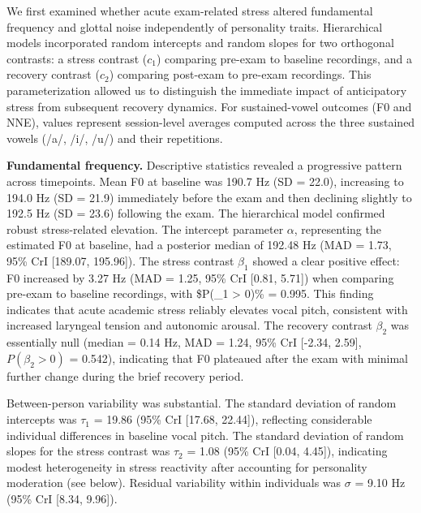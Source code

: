 \documentclass[
  english,
  man]{apa6}
\begin{document}
We first examined whether acute exam-related stress altered fundamental frequency and glottal noise independently of personality traits. Hierarchical models incorporated random intercepts and random slopes for two orthogonal contrasts: a stress contrast (\(c_1\)) comparing pre-exam to baseline recordings, and a recovery contrast (\(c_2\)) comparing post-exam to pre-exam recordings. This parameterization allowed us to distinguish the immediate impact of anticipatory stress from subsequent recovery dynamics. For sustained-vowel outcomes (F0 and NNE), values represent session-level averages computed across the three sustained vowels (/a/, /i/, /u/) and their repetitions.

\textbf{Fundamental frequency.} Descriptive statistics revealed a progressive pattern across timepoints. Mean F0 at baseline was 190.7 Hz (SD = 22.0), increasing to 194.0 Hz (SD = 21.9) immediately before the exam and then declining slightly to 192.5 Hz (SD = 23.6) following the exam. The hierarchical model confirmed robust stress-related elevation. The intercept parameter \(\alpha\), representing the estimated F0 at baseline, had a posterior median of 192.48 Hz (MAD = 1.73, 95\% CrI {[}189.07, 195.96{]}). The stress contrast \(\beta_1\) showed a clear positive effect: F0 increased by 3.27 Hz (MAD = 1.25, 95\% CrI {[}0.81, 5.71{]}) when comparing pre-exam to baseline recordings, with \$P(\beta\_1 \textgreater{} 0)\% = 0.995. This finding indicates that acute academic stress reliably elevates vocal pitch, consistent with increased laryngeal tension and autonomic arousal. The recovery contrast \(\beta_2\) was essentially null (median = 0.14 Hz, MAD = 1.24, 95\% CrI {[}-2.34, 2.59{]}, \(P(\beta_2 > 0)\) = 0.542), indicating that F0 plateaued after the exam with minimal further change during the brief recovery period.

Between-person variability was substantial. The standard deviation of random intercepts was \(\tau_1\) = 19.86 (95\% CrI {[}17.68, 22.44{]}), reflecting considerable individual differences in baseline vocal pitch. The standard deviation of random slopes for the stress contrast was \(\tau_2\) = 1.08 (95\% CrI {[}0.04, 4.45{]}), indicating modest heterogeneity in stress reactivity after accounting for personality moderation (see below). Residual variability within individuals was \(\sigma\) = 9.10 Hz (95\% CrI {[}8.34, 9.96{]}).
\end{document}
